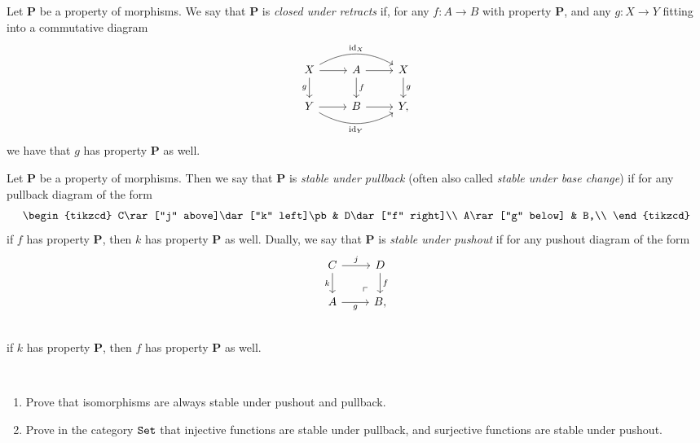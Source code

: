 \begin{definition}\label{def:closed-under-retracts} Let \textbf{P} be a property of morphisms. We say that \textbf{P} is \textit{closed under retracts} if, for any $f: A \to B$ with property \textbf{P}, and any $g: X \to Y$ fitting into a commutative diagram
\[ \begin{tikzcd}
    X\ar[rr,bend left=30,"\id_X" above]\dar["g" left]\rar & A\dar["f"]\rar & X\dar["g" right]\\
    Y\rar\ar[rr,bend right=30,"\id_Y" below] & B\rar & Y,
\end{tikzcd} \]
we have that $g$ has property \textbf{P} as well.
\end{definition}







\begin{definition} Let \textbf{P} be a property of morphisms. Then we say that \textbf{P} is \textit{stable under pullback} (often also called \textit{stable under base change}) if for any pullback diagram of the form
\[ \begin{tikzcd}
    C\rar["j" above]\dar["k" left]\pb & D\dar["f" right]\\
    A\rar["g" below] & B,\\
\end{tikzcd} \]
if $f$ has property \textbf{P}, then $k$ has property \textbf{P} as well. Dually, we say that \textbf{P} is \textit{stable under pushout} if for any pushout diagram of the form
\[ \begin{tikzcd}
    C\rar["j" above]\dar["k" left] & D\dar["f" right]\\
    A\rar["g" below] & B\po,\\
\end{tikzcd} \]
if $k$ has property \textbf{P}, then $f$ has property \textbf{P} as well.
\end{definition}

\begin{exercise}\label{exer:injective-stable-under-pullback} $\ $
\begin{enumerate}
    \item Prove that isomorphisms are always stable under pushout and pullback.
    \item Prove in the category $\texttt{Set}$ that injective functions are stable under pullback, and surjective functions are stable under pushout.
\end{enumerate}
\end{exercise}


